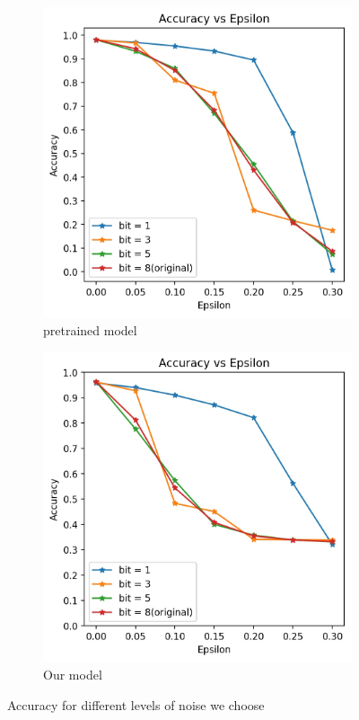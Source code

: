 \begin{figure}[h!]
	\centering
	\begin{subfigure}{.4\textwidth}
		\includegraphics[width=\textwidth]{pretrained_Accuracy_vs_Epsilon_db.jpg}
		\caption{pretrained model}
		\label{fig: bit-depth reduction pre}
	\end{subfigure}
	\begin{subfigure}{.4\textwidth}
		\includegraphics[width=\textwidth]{Accuracy_vs_Epsilon_db.jpg}
		\caption{Our model}
		\label{fig: bit-depth reduction us}
	\end{subfigure}
	\caption{Accuracy for different levels of noise we choose}
\end{figure}

